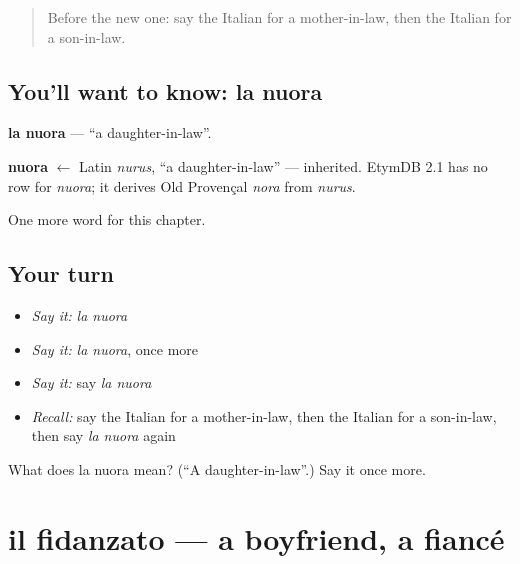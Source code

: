 \label{lesson:IT-C251-nuora}



\begin{quote}
Before the new one: say the Italian for a mother-in-law, then the Italian for a son-in-law.
\end{quote}

\subsection*{You'll want to know: la nuora}
\textbf{la nuora} — \textquotedblleft{}a daughter-in-law\textquotedblright{}.

\begin{cousinweb}
\textbf{nuora} $\leftarrow$ Latin \emph{nurus}, \textquotedblleft{}a daughter-in-law\textquotedblright{} — inherited. EtymDB 2.1 has no row for \emph{nuora}; it derives Old Provençal \emph{nora} from \emph{nurus}.
\end{cousinweb}

\begin{grammarlens}[title={What you've built}]
One more word for this chapter.
\end{grammarlens}

\subsection*{Your turn}
\begin{itemize}
\raggedright
  \item \emph{Say it:} \emph{la nuora}
  \item \emph{Say it:} \emph{la nuora}, once more
  \item \emph{Say it:} say \emph{la nuora}
  \item \emph{Recall:} say the Italian for a mother-in-law, then the Italian for a son-in-law, then say \emph{la nuora} again
\end{itemize}

\begin{tcolorbox}[breakable,colback=teal!4,colframe=teal!35!black,title={Before you move on}]
What does la nuora mean? (\textquotedblleft{}A daughter-in-law\textquotedblright{}.) Say it once more.
\end{tcolorbox}
\section[il fidanzato]{il fidanzato — a boyfriend, a fiancé}

\label{lesson:IT-C251-fidanzato}



